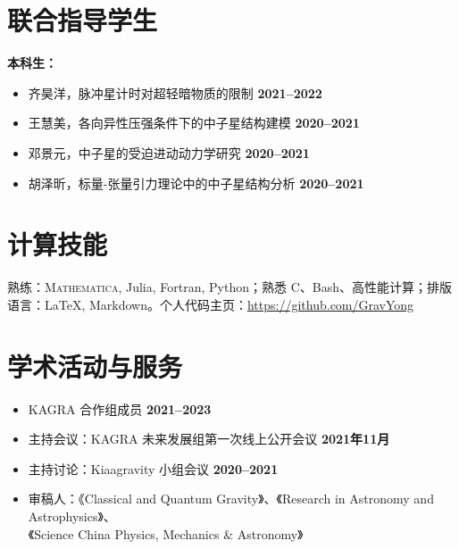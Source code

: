\documentclass[margin,line]{res_mod}
\begin{document}
\begin{resume}
\section{联合指导学生}


\textbf{本科生：}
\begin{itemize}
  \item 齐昊洋，脉冲星计时对超轻暗物质的限制 \hfill \textbf{2021–2022}
  \item 王慧美，各向异性压强条件下的中子星结构建模 \hfill \textbf{2020–2021}
  \item 邓景元，中子星的受迫进动动力学研究 \hfill \textbf{2020–2021}
  \item 胡泽昕，标量-张量引力理论中的中子星结构分析 \hfill \textbf{2020–2021}
\end{itemize}


\section{计算技能}
熟练：\textsc{Mathematica}, Julia, Fortran, Python；熟悉 C、Bash、高性能计算；排版语言：\LaTeX, Markdown。个人代码主页：\url{https://github.com/GravYong}

\section{学术活动与服务}
\begin{itemize}
  \item KAGRA 合作组成员 \hfill \textbf{2021–2023}
  \item 主持会议：KAGRA 未来发展组第一次线上公开会议 \hfill \textbf{2021年11月}
  \item 主持讨论：Kiaagravity 小组会议 \hfill \textbf{2020–2021}
  \item 审稿人：《Classical and Quantum Gravity》、《Research in Astronomy and Astrophysics》、\\
  \phantom{审稿人：}《Science China Physics, Mechanics \& Astronomy》
\end{itemize}


\ifx\nopubs\undefined

\else
%
\fi


\end{resume}
\end{document}
